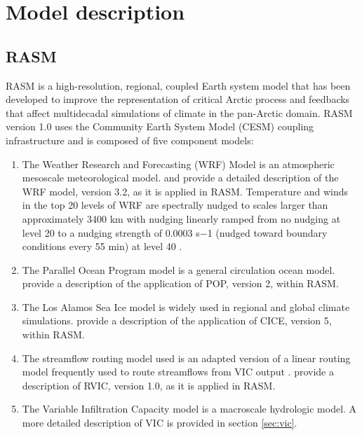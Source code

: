 \section{Model description}
\label{sec:models_ch3}

\subsection{RASM}

RASM is a high-resolution, regional, coupled Earth system model that has been developed to improve the representation of critical Arctic process and feedbacks that affect multidecadal simulations of climate in the pan-Arctic domain.
RASM version 1.0 uses the Community Earth System Model (CESM) coupling infrastructure \citep[CPL7; ][]{Craig_2012,Roberts_2015a} and is composed of five component models:

\begin{enumerate}
  \item The Weather Research and Forecasting (WRF) Model \citep{Skamarock_2008} is an atmospheric mesoscale meteorological model. \citet{DuVivier_2016} and \citet{Cassano_2016} provide a detailed description of the WRF model, version 3.2, as it is applied in RASM. Temperature and winds in the top 20 levels of WRF are spectrally nudged to scales larger than approximately 3400 km with nudging linearly ramped from no nudging at level 20 to a nudging strength of 0.0003 s−1 (nudged toward boundary conditions every 55 min) at level 40 \citep{Glisan_2013,Skamarock_2008}.
  \item The Parallel Ocean Program model \citep[POP; ][]{Smith_2010} is a general circulation ocean model. \citet{Roberts_2015a} provide a description of the application of POP, version 2, within RASM.
  \item The Los Alamos Sea Ice model \citep[CICE; ]{Hunke2015} is widely used in regional and global climate simulations. \citet{Roberts_2015a} provide a description of the application of CICE, version 5, within RASM.
  \item The streamflow routing model used is an adapted version of a linear routing model frequently used to route streamflows from VIC output \citep[RVIC; ][]{Lohmann_1996,Lohmann_1998b}. \citet{Hamman_2016b} provide a description of RVIC, version 1.0, as it is applied in RASM.
  \item The Variable Infiltration Capacity model \citep[VIC; ][]{Liang_1994,Liang_1996} is a macroscale hydrologic model. A more detailed description of VIC is provided in section \ref{sec:vic}.
\end{enumerate}

